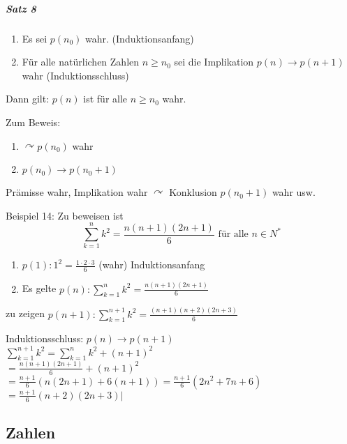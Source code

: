 \documentclass[a4paper]{scrartcl}
\begin{document}
\subparagraph{Satz 8}
\begin{enumerate}
\item Es sei $p(n_0)$ wahr. (Induktionsanfang)
\item Für alle natürlichen Zahlen $n\geq n_0$ sei die Implikation $p(n) \rightarrow p(n+1)$ wahr (Induktionsschluss)
\end{enumerate}
Dann gilt: $p(n)$ ist für alle $n\geq n_0$ wahr.

Zum Beweis:
\begin{enumerate}
\item $\curvearrowright p(n_0)$ wahr
\item $p(n_0) \rightarrow p(n_0 + 1)$
\end{enumerate}
Prämisse wahr, Implikation wahr $\curvearrowright$ Konklusion $p(n_0 +1 )$ wahr usw.

Beispiel 14: Zu beweisen ist 
\[ \sum\limits_{k=1}^{n} k^2 = \frac{n(n + 1)(2n + 1)}{6} \text{ für alle } n\in N^*\]
\begin{enumerate}
\item $p(1): 1^2 = \frac{1\cdot 2\cdot 3}{6}$ (wahr) Induktionsanfang
\item Es gelte $p(n): \sum\limits_{k=1}^{n} k^2 = \frac{n(n + 1)(2n + 1)}{6}$
\end{enumerate}
zu zeigen $p(n+1) : \sum\limits_{k=1}^{n+1} k^2 = \frac{(n+1)(n+2)(2n+3)}{6}$

Induktionsschluss: $p(n) \rightarrow p(n+1)$\\
$\sum\limits_{k=1}^{n+1} k^2 = \sum\limits_{k=1}^{n} k^2 + (n+1)^2$\\
$= \frac{n(n+1)(2n+1)}{6} + (n+1)^2$\\
$= \frac{n+1}{6} (n(2n +1) + 6(n+1)) = \frac{n+1}{6} (2n^2 + 7n +6)$\\
$=\frac{n+1}{6} (n+2)(2n+3)|$\\

\subsection{Zahlen}
\end{document}
